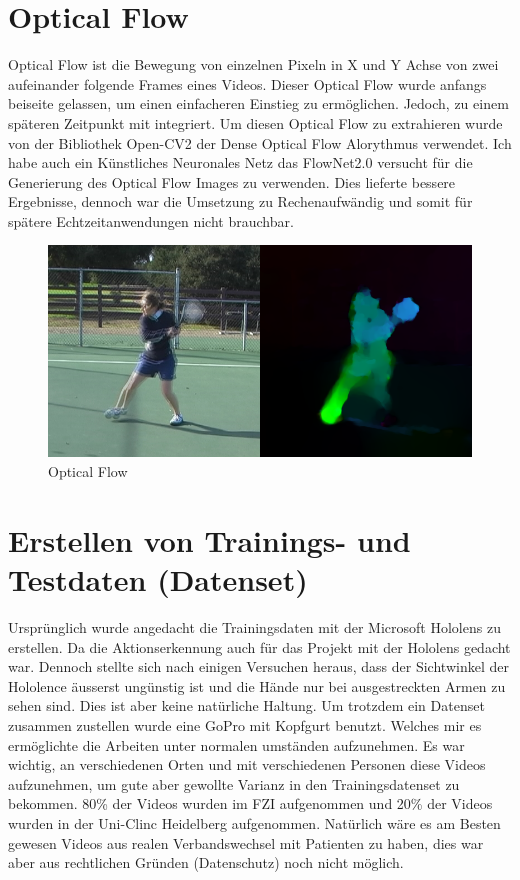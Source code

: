 \newpage

\section{Optical Flow}
\label{sec:OpticalFlow}
Optical Flow ist die Bewegung von einzelnen Pixeln in X und Y Achse von zwei aufeinander folgende Frames eines Videos. Dieser Optical Flow wurde anfangs beiseite gelassen, um einen einfacheren Einstieg zu ermöglichen. Jedoch, zu einem späteren Zeitpunkt mit integriert. Um diesen Optical Flow zu extrahieren wurde von der Bibliothek Open-CV2 der Dense Optical Flow Alorythmus verwendet. Ich habe auch ein Künstliches Neuronales Netz das FlowNet2.0 \cite{FlowNet2.0} versucht für die Generierung des Optical Flow Images zu verwenden. Dies lieferte bessere Ergebnisse, dennoch war die Umsetzung zu Rechenaufwändig und somit für spätere Echtzeitanwendungen nicht brauchbar.

\begin{figure}[!htb]
  \centering
  \includegraphics[scale=0.3]{img/tennis.png}
  \caption{Optical Flow   \cite{Bro11a}}
  \label{fig:Optical FLow}
\end{figure}

\section{Erstellen von Trainings- und Testdaten (Datenset)}
\label{sec:Datenset}
Ursprünglich wurde angedacht die Trainingsdaten mit der Microsoft Hololens zu erstellen. Da die Aktionserkennung auch für das Projekt mit der Hololens gedacht war. Dennoch stellte sich nach einigen Versuchen heraus, dass der Sichtwinkel der Hololence äusserst ungünstig ist und die Hände nur bei ausgestreckten Armen zu sehen sind. Dies ist aber keine natürliche Haltung. Um trotzdem ein Datenset zusammen zustellen wurde eine GoPro mit Kopfgurt benutzt. Welches mir es ermöglichte die Arbeiten unter normalen umständen aufzunehmen. Es war wichtig, an verschiedenen Orten und mit verschiedenen Personen diese Videos aufzunehmen, um gute aber gewollte Varianz in den Trainingsdatenset zu bekommen. 80\% der Videos wurden im FZI aufgenommen und 20\% der Videos wurden in der Uni-Clinc Heidelberg aufgenommen. Natürlich wäre es am Besten gewesen Videos aus realen Verbandswechsel mit Patienten zu haben, dies war aber aus rechtlichen Gründen (Datenschutz) noch nicht möglich.

